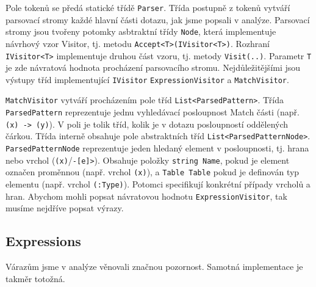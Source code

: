 Pole tokenů se předá statické třídě \texttt{Parser}.
Třída postupně z tokenů vytváří parsovací stromy každé hlavní části dotazu, jak jsme popsali v analýze.
Parsovací stromy jsou tvořeny potomky asbtraktní třídy \texttt{Node}, která implementuje návrhový vzor Visitor, tj. metodu \texttt{Accept<T>(IVisitor<T>)}.
Rozhraní \texttt{IVisitor<T>} implementuje druhou část vzoru, tj. metody \texttt{Visit(..)}.
Parametr \texttt{T} je zde návratová hodnota procházení parsovacího stromu.
Nejdůležitějšími jsou výstupy tříd implementující \texttt{IVisitor} \texttt{ExpressionVisitor} a \texttt{MatchVisitor}.

\texttt{MatchVisitor} vytváří procházením pole tříd \texttt{List<ParsedPattern>}.
Třída \texttt{ParsedPattern} reprezentuje jednu vyhledávací posloupnost Match části (např. \texttt{(x) -> (y)}).
V poli je tolik tříd, kolik je v dotazu posloupností oddělených čárkou.
Třída interně obsahuje pole abstraktních tříd \texttt{List<ParsedPatternNode>}. 
\texttt{ParsedPatternNode} reprezentuje jeden hledaný element v posloupnosti, tj. hrana nebo vrchol (\texttt{(x)}/\texttt{-[e]>}).
Obsahuje položky \texttt{string Name}, pokud je element označen proměnnou (např. vrchol \texttt{(x)}), a \texttt{Table Table} pokud je definován typ elementu (např. vrchol \texttt{(:Type)}).
Potomci specifikují konkrétní případy vrcholů a hran.
Abychom mohli popsat návratovou hodnotu \texttt{ExpressionVisitor}, tak musíme nejdříve popsat výrazy.

\subsection{Expressions}

Várazům jsme v analýze věnovali značnou pozornost.
Samotná implementace je takměr totožná.
